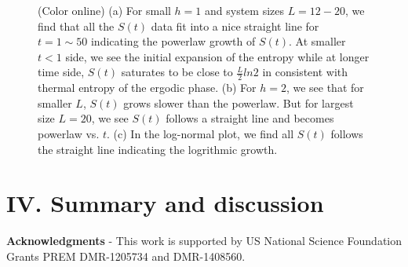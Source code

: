 \documentclass[prl,aps,epsf,showpacs,twocolumn]{revtex4}
\begin{document}
\begin{figure}[b]
\caption{(Color online) (a) For small $h=1$ and system sizes $L=12-20$,   we find that 
all the $S(t)$ data fit into a nice straight line for $t=1\sim 50$ indicating the powerlaw growth of $S(t)$.
At smaller $t<1$ side,  we see the initial expansion of the entropy  while at longer time  side, $S(t)$ saturates
to be close to $\frac L 2 ln2$ in consistent with thermal entropy of the ergodic phase.
(b) For $h=2$,  we see that for smaller $L$, $S(t)$ grows slower than the powerlaw.
But for largest size $L=20$, we see $S(t)$ follows a straight line and becomes powerlaw vs. $t$.
(c) In the log-normal plot, we find all $S(t)$ follows the straight line indicating the 
logrithmic growth.
 }
\label{fig3}
\end{figure} 






\section{IV. Summary and discussion}


                                 

{\bf Acknowledgments} - 
 This work is supported by US National Science Foundation  Grants 
PREM DMR-1205734 and DMR-1408560.


%
 
\end{document}
